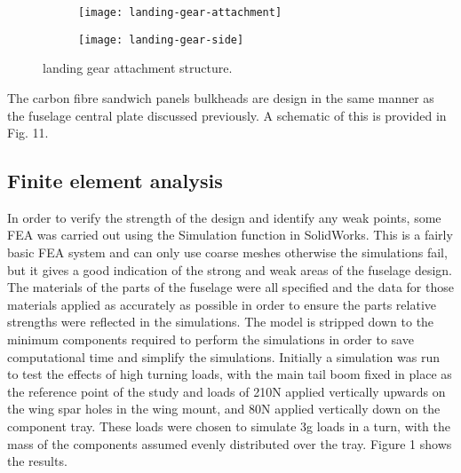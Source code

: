 \documentclass[../../main.tex]{subfiles}
\begin{document}
\begin{figure}[H]

    \centering
    \begin{subfigure}[b]{0.4\columnwidth}
        \centering
        \texttt{[image: landing-gear-attachment]}
        \caption{}
        \label{fig:landing-gear-attachment:angled}
    \end{subfigure}
    \hfill
    \begin{subfigure}[b]{0.49\columnwidth}
        \centering
        \texttt{[image: landing-gear-side]}
        \caption{}
        \label{fig:landing-gear-attachment:side}
    \end{subfigure}
    
    \caption{landing gear attachment structure.}
    \label{fig:landing-gear-attachment}
\end{figure}

The carbon fibre sandwich panels bulkheads are design in the same manner as the fuselage central plate discussed previously.
A schematic of this is provided in Fig. 11. 


\subsection{Finite element analysis} \label{sec:final-design-proposal:fuselage:finite-element-analysis}

In order to verify the strength of the design and identify any weak points, some FEA was carried out using the Simulation function in SolidWorks.
This is a fairly basic FEA system and can only use coarse meshes otherwise the simulations fail, but it gives a good indication of the strong and weak areas of the fuselage design.
The materials of the parts of the fuselage were all specified and the data for those materials applied as accurately as possible in order to ensure the parts relative strengths were reflected in the simulations.
The model is stripped down to the minimum components required to perform the simulations in order to save computational time and simplify the simulations.
Initially a simulation was run to test the effects of high turning loads, with the main tail boom fixed in place as the reference point of the study and loads of 210N applied vertically upwards on the wing spar holes in the wing mount, and 80N applied vertically down on the component tray.
These loads were chosen to simulate 3g loads in a turn, with the mass of the components assumed evenly distributed over the tray.
Figure 1 shows the results.
\end{document}
